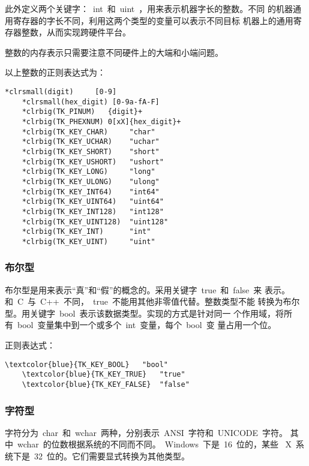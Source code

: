 此外定义两个关键字：~int~和~uint~，用来表示机器字长的整数。不同
的机器通用寄存器的字长不同，利用这两个类型的变量可以表示不同目标
机器上的通用寄存器整数，从而实现跨硬件平台。

整数的内存表示只需要注意不同硬件上的大端和小端问题。

以上整数的正则表达式为：

\newcommand{\clrsmall}[1]{\textcolor{magenta}{#1}}
\newcommand{\clrbig}[1]{\textcolor{blue}{#1}}

\begin{Verbatim}[frame=single, commandchars=*()]
    *clrsmall(digit)     [0-9]
    *clrsmall(hex_digit) [0-9a-fA-F]
    *clrbig(TK_PINUM)   {digit}+
    *clrbig(TK_PHEXNUM) 0[xX]{hex_digit}+
    *clrbig(TK_KEY_CHAR)     "char"
    *clrbig(TK_KEY_UCHAR)    "uchar"
    *clrbig(TK_KEY_SHORT)    "short"
    *clrbig(TK_KEY_USHORT)   "ushort"
    *clrbig(TK_KEY_LONG)     "long"
    *clrbig(TK_KEY_ULONG)    "ulong"
    *clrbig(TK_KEY_INT64)    "int64"
    *clrbig(TK_KEY_UINT64)   "uint64"
    *clrbig(TK_KEY_INT128)   "int128"
    *clrbig(TK_KEY_UINT128)  "uint128"
    *clrbig(TK_KEY_INT)      "int"
    *clrbig(TK_KEY_UINT)     "uint"
\end{Verbatim}

\subsubsection{布尔型}

布尔型是用来表示“真”和“假”的概念的。采用关键字~true~和~false~来
表示。和~C~与~C++~不同，~true~不能用其他非零值代替。整数类型不能
转换为布尔型。用关键字~bool~表示该数据类型。实现的方式是针对同一
个作用域，将所有~bool~变量集中到一个或多个~int~变量，每个~bool~变
量占用一个位。

正则表达式：

\begin{Verbatim}[frame=single, commandchars=\\\{\}]
    \textcolor{blue}{TK_KEY_BOOL}   "bool"
    \textcolor{blue}{TK_KEY_TRUE}   "true"
    \textcolor{blue}{TK_KEY_FALSE}  "false"
\end{Verbatim}

\subsubsection{字符型}

字符分为~char~和~wchar~两种，分别表示~ANSI~字符和~UNICODE~字符。
其中~wchar~的位数根据系统的不同而不同。~Windows~下是~16~位的，某些
~X~系统下是~32~位的。它们需要显式转换为其他类型。

